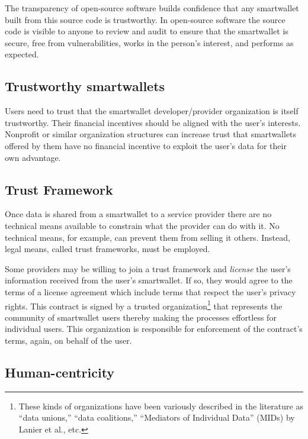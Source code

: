 \documentclass[11pt, oneside]{article}   	%
\begin{document}
The transparency of open-source software builds confidence that any smartwallet built from this source code is trustworthy. In open-source software the source code is visible to anyone to review and audit to ensure that the smartwallet is secure, free from vulnerabilities, works in the person's interest, and performs as expected.

\subsection{Trustworthy smartwallets}

Users need to trust that the smartwallet developer/provider organization is itself trustworthy. Their financial incentives should be aligned with the user's interests. Nonprofit or similar organization structures can increase trust that smartwallets offered by them have no financial incentive to exploit the user's data for their own advantage. 

\subsection{Trust Framework}

Once data is shared from a smartwallet to a service provider there are no technical means available to constrain what the provider can do with it. No technical means, for example, can prevent them from selling it others. Instead, legal means, called trust frameworks, must be employed. 

Some providers may be willing to join a trust framework and \emph{license} the user's information received from the user's smartwallet. If so, they would agree to the terms of a license agreement which include terms that respect the user's privacy rights. This contract is signed by a trusted organization\footnote{These kinds of organizations have been variously described in the literature as ``data unions,'' ``data coalitions,'' ``Mediators of Individual Data'' (MIDs) by Lanier et al.\cite{Lanier2018}, etc.} that represents the community of smartwallet users thereby making the processes effortless for individual users. This organization is responsible for enforcement of the contract's terms, again, on behalf of the user.

\subsection{Human-centricity}
\end{document}
